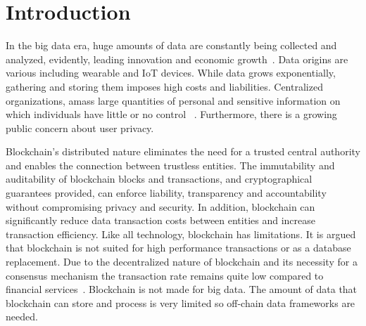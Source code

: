 \chapter{Introduction}
\label{introduction}

In the big data era, huge amounts of data are constantly being collected and analyzed, evidently, leading innovation and
economic growth~\cite{10.1109/SPW.2015.27}. Data origins are various including wearable and IoT devices.
While data grows exponentially, gathering and storing them imposes high costs and liabilities.
Centralized organizations, amass large quantities of personal and sensitive information on which individuals have little or no control ~\cite{10.1109/SPW.2015.27}.
Furthermore, there is a growing public concern about user privacy.

Blockchain’s distributed nature eliminates the need for a trusted central authority and enables the connection between trustless entities.
The immutability and auditability of blockchain blocks and transactions, and cryptographical guarantees provided, can enforce liability, transparency and accountability without compromising privacy and security.
In addition, blockchain can significantly reduce data transaction costs between entities and increase transaction efficiency.
Like all technology, blockchain has limitations. It is argued that blockchain is not suited for high performance transactions or as a database replacement.
Due to the decentralized nature of blockchain and its necessity for a consensus mechanism the transaction rate remains quite low compared to financial services~\cite{Sompolinsky2015,Zohar:2015:BUH:2817191.2701411}.
Blockchain is not made for big data. The amount of data that blockchain can store and process is very limited so off-chain data frameworks are needed.
